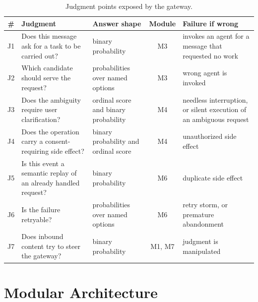 \documentclass[runningheads,a4paper]{llncs}
\begin{document}
\begin{table}[htbp]

\centering

\small

\caption{Judgment points exposed by the gateway.}\label{tab:1}

\begin{tabularx}{\textwidth}{@{}cXp{2.6cm}c>{\raggedright\arraybackslash}X@{}}

\toprule

\textbf{\#} & \textbf{Judgment} & \textbf{Answer shape} & \textbf{Module} & \textbf{Failure if wrong} \\

\midrule

J1 & Does this message ask for a task to be carried out? & binary probability & M3 & invokes an agent for a message that requested no work \\

J2 & Which candidate should serve the request? & probabilities over named options & M3 & wrong agent is invoked \\

J3 & Does the ambiguity require user clarification? & ordinal score and binary probability & M4 & needless interruption, or silent execution of an ambiguous request \\

J4 & Does the operation carry a consent-requiring side effect? & binary probability and ordinal score & M4 & unauthorized side effect \\

J5 & Is this event a semantic replay of an already handled request? & binary probability & M6 & duplicate side effect \\

J6 & Is the failure retryable? & probabilities over named options & M6 & retry storm, or premature abandonment \\

J7 & Does inbound content try to steer the gateway? & binary probability & M1, M7 & judgment is manipulated \\

\bottomrule

\end{tabularx}

\end{table}

\section{Modular Architecture}
\end{document}
